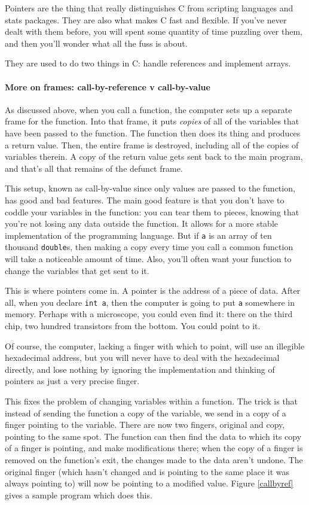 \documentclass[12pt]{article}
\def\ind#1{\index{#1}#1}
\begin{document}
Pointers are the thing that really distinguishes C from scripting
languages and stats packages. They are also what makes C fast and
flexible. If you've never dealt with them before, you will spent some
quantity of time puzzling over them, and then you'll wonder what all the
fuss is about. 

They are used to do two things in C: handle references and implement arrays.

\paragraph{More on \ind{frames}: \ind{call-by-reference} v \ind{call-by-value}}

As discussed above,
when you call a function, the computer sets up a separate frame
for the function. Into that frame, it puts {\it copies} of all of the
variables that have been passed to the function. The function then does its
thing and produces a return value. Then, the entire frame is destroyed,
including all of the copies of variables therein. A copy of the return value gets
sent back to the main program, and that's all that remains of the defunct
frame. 

This setup, known as call-by-value since only values are passed to the
function, has good and bad features. The main good feature is that you
don't have to coddle your variables in the function: you can tear them to
pieces, knowing that you're not losing any data outside the function. It
allows for a more stable implementation of the programming language. But if {\tt a}
is an array of ten thousand {\tt double}s, then making a copy every time
you call a common function will take a noticeable amount of time. Also,
you'll often want your function to change the variables that get
sent to it.

This is where pointers come in. A pointer is the address of a piece of
data. After all, when you declare {\tt int a}, then the computer is
going to put {\tt a} somewhere in memory. Perhaps with a microscope,
you could even find it: there on the third chip, two hundred transistors
from the bottom. You could point to it.

Of course, the computer, lacking a finger with which to point, will use
an illegible hexadecimal address, but you will never have to deal with
the hexadecimal directly, and lose nothing by ignoring the implementation
and thinking of pointers as just a very precise finger.

This fixes the problem of changing variables within a function. The
trick is that instead of sending the function a copy of the variable,
we send in a copy of a finger pointing to the variable. There are now
two fingers, original and copy, pointing to the same spot. The
function can then find the data to which its copy of a finger is pointing,
and make modifications there; when the copy of a finger is removed on the
function's exit, the changes made to the data aren't undone.
The original finger (which hasn't changed and is pointing to the same
place it was always pointing to) will now be pointing to a modified value.
Figure \ref{callbyref} gives a sample program which does this.
\end{document}
